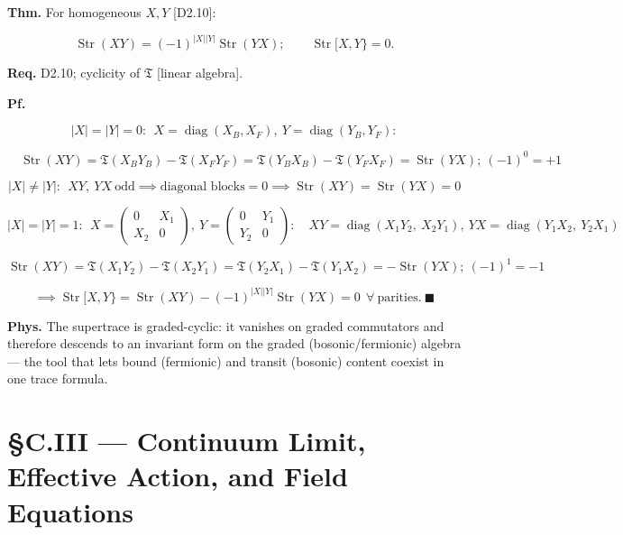 \begin{theorem}\label{tag:CT2-10}
\textbf{Thm.} For homogeneous $X,Y$ [D2.10]:

\[
\operatorname{Str}(XY)=(-1)^{|X||Y|}\operatorname{Str}(YX);\qquad
\operatorname{Str}[X,Y\}=0 .
\]

\textbf{Req.} D2.10; cyclicity of $\mathfrak T$ [linear algebra].

\textbf{Pf.}

\[
|X|=|Y|=0:\ \ X=\operatorname{diag}(X_B,X_F),\ Y=\operatorname{diag}(Y_B,Y_F):
\]

\[
\quad \operatorname{Str}(XY)=\mathfrak T(X_BY_B)-\mathfrak T(X_FY_F)=\mathfrak T(Y_BX_B)-\mathfrak T(Y_FX_F)=\operatorname{Str}(YX);\ (-1)^0=+1
\]

\[
|X|\ne|Y|:\ \ XY,\ YX\ \text{odd}\implies\text{diagonal blocks}=0\implies\operatorname{Str}(XY)=\operatorname{Str}(YX)=0
\]

\[
|X|=|Y|=1:\ \ X=\begin{pmatrix}0&X_1\\ X_2&0\end{pmatrix},\ Y=\begin{pmatrix}0&Y_1\\ Y_2&0\end{pmatrix}:\quad
XY=\operatorname{diag}(X_1Y_2,\ X_2Y_1),\ YX=\operatorname{diag}(Y_1X_2,\ Y_2X_1)
\]

\[
\operatorname{Str}(XY)=\mathfrak T(X_1Y_2)-\mathfrak T(X_2Y_1)=\mathfrak T(Y_2X_1)-\mathfrak T(Y_1X_2)=-\operatorname{Str}(YX);\ (-1)^{1}=-1
\]

\[
\implies\operatorname{Str}[X,Y\}=\operatorname{Str}(XY)-(-1)^{|X||Y|}\operatorname{Str}(YX)=0\ \ \forall\ \text{parities}.\ \blacksquare
\]

\textbf{Phys.} The supertrace is graded-cyclic: it vanishes on graded commutators and therefore descends to an invariant form on the graded (bosonic/fermionic) algebra — the tool that lets bound (fermionic) and transit (bosonic) content coexist in one trace formula.

\end{theorem}

\section[§C.III — Continuum Limit, Effective Action, and Field…]{\texorpdfstring{§C.III — Continuum Limit, Effective Action, and Field Equations}{SC.III - Continuum Limit, Effective Action, and Field Equations}}

